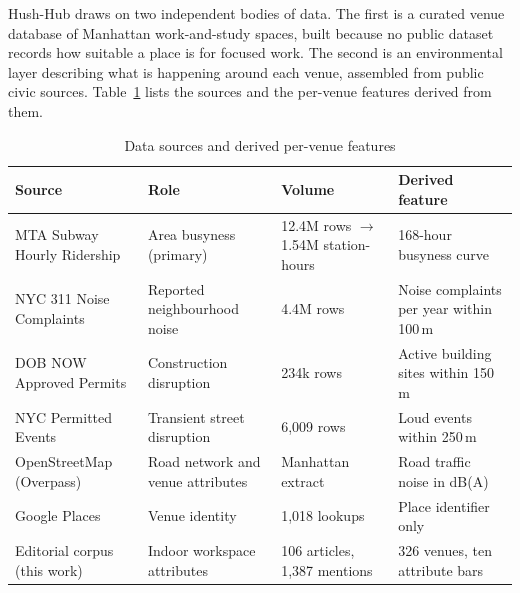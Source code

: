 \documentclass[conference]{IEEEtran}
\begin{document}
Hush-Hub draws on two independent bodies of data. The first is a curated venue database of Manhattan work-and-study spaces, built because no public dataset records how suitable a place is for focused work. The second is an environmental layer describing what is happening around each venue, assembled from public civic sources. Table~\ref{tab:datasources} lists the sources and the per-venue features derived from them.

\begin{table}[htbp]
\caption{Data sources and derived per-venue features}
\label{tab:datasources}
\begin{center}
\scriptsize
\setlength{\tabcolsep}{2pt}
\begin{tabular}{@{}|p{}|p{}|p{}|p{}|@{}}
\hline
\textbf{Source} & \textbf{Role} & \textbf{Volume} & \textbf{Derived feature} \\
\hline
MTA Subway Hourly Ridership & Area busyness (primary) & 12.4M rows $\rightarrow$ 1.54M station-hours & 168-hour busyness curve~
\cite{nycopendata2026} \\
\hline
NYC 311 Noise Complaints & Reported neighbourhood noise & 4.4M rows & Noise complaints per year within 100\,m~
\cite{nycopendata2026} \\
\hline
DOB NOW Approved Permits & Construction disruption & 234k rows & Active building sites within 150\,m~
\cite{nycopendata2026} \\
\hline
NYC Permitted Events & Transient street disruption & 6,009 rows & Loud events within 250\,m~
\cite{nycopendata2026} \\
\hline
OpenStreetMap (Overpass) & Road network and venue attributes & Manhattan extract & Road traffic noise in dB(A)~
\cite{osm2026} \\
\hline
Google Places & Venue identity & 1,018 lookups & Place identifier only~
\cite{googlemapsplatform2026} \\
\hline
Editorial corpus (this work) & Indoor workspace attributes & 106 articles, 1,387 mentions & 326 venues, ten attribute bars \\
\hline
\end{tabular}
\end{center}
\end{table}
\end{document}
